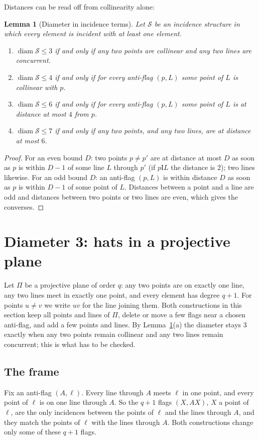 \documentclass[11pt]{amsart}
\newtheorem{lemma}[theorem]{Lemma}
\theoremstyle{definition}
\theoremstyle{remark}
\newcommand{\I}{\mathrel{\mathrm{I}}}
\newcommand{\cS}{\mathcal{S}}
\newcommand{\diam}{\operatorname{diam}}
\begin{document}
Distances can be read off from collinearity alone:

\begin{lemma}[Diameter in incidence terms]\label{lem:diam}
Let $\cS$ be an incidence structure in which every element is incident with at least one element.
\begin{enumerate}[label=\textup{(\alph*)}]
\item $\diam\cS\le 3$ if and only if any two points are collinear and any two lines are concurrent.
\item $\diam\cS\le 4$ if and only if for every anti-flag $(p,L)$ some point of $L$ is collinear with $p$.
\item $\diam\cS\le 6$ if and only if for every anti-flag $(p,L)$ some point of $L$ is at distance at most $4$ from $p$.
\item $\diam\cS\le 7$ if and only if any two points, and any two lines, are at distance at most $6$.
\end{enumerate}
\end{lemma}

\begin{proof}
For an even bound $D$: two points $p\neq p'$ are at distance at most $D$ as soon as $p$ is within $D-1$ of some line $L$ through $p'$ (if $p\I L$ the distance is $2$); two lines likewise. For an odd bound $D$: an anti-flag $(p,L)$ is within distance $D$ as soon as $p$ is within $D-1$ of some point of $L$. Distances between a point and a line are odd and distances between two points or two lines are even, which gives the converses.
\end{proof}

\section{Diameter 3: hats in a projective plane}\label{sec:d3}

Let $\Pi$ be a projective plane of order $q$: any two points are on exactly one line, any two lines meet in exactly one point, and every element has degree $q+1$. For points $u\ne v$ we write $uv$ for the line joining them. Both constructions in this section keep all points and lines of $\Pi$, delete or move a few flags near a chosen anti-flag, and add a few points and lines. By Lemma~\ref{lem:diam}(a) the diameter stays $3$ exactly when any two points remain collinear and any two lines remain concurrent; this is what has to be checked.

\subsection{The frame}\label{ssec:frame}
Fix an anti-flag $(A,\ell)$. Every line through $A$ meets $\ell$ in one point, and every point of $\ell$ is on one line through $A$. So the $q+1$ flags $(X,AX)$, $X$ a point of $\ell$, are the only incidences between the points of $\ell$ and the lines through $A$, and they match the points of $\ell$ with the lines through $A$. Both constructions change only some of these $q+1$ flags.
\end{document}
